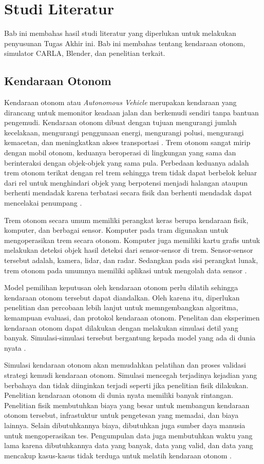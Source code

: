 \chapter{Studi Literatur}

Bab ini membahas hasil studi literatur yang diperlukan untuk melakukan
penyusunan Tugas Akhir ini. Bab ini membahas tentang kendaraan otonom, simulator
CARLA, Blender, dan penelitian terkait.

\section{Kendaraan Otonom}
Kendaraan otonom atau \textit{Autonomous Vehicle} merupakan kendaraan yang
dirancang untuk memonitor keadaan jalan dan berkemudi sendiri tanpa bantuan
pengemudi. Kendaraan otonom dibuat dengan tujuan mengurangi jumlah kecelakaan,
mengurangi penggunaan energi, mengurangi polusi, mengurangi kemacetan, dan
meningkatkan akses transportasi \parencite{av-bagloee}. Trem otonom sangat mirip
dengan mobil otonom, keduanya beroperasi di lingkungan yang sama dan
berinteraksi dengan objek-objek yang sama pula. Perbedaan keduanya adalah trem
otonom terikat dengan rel trem sehingga trem tidak dapat berbelok keluar dari
rel untuk menghindari objek yang berpotensi menjadi halangan ataupun berhenti
mendadak karena terbatasi secara fisik dan berhenti mendadak dapat mencelakai
penumpang \parencite{at-palmer}.

Trem otonom secara umum memiliki perangkat keras berupa kendaraan fisik,
komputer, dan berbagai sensor. Komputer pada tram digunakan untuk mengoperasikan
trem secara otonom. Komputer juga memiliki kartu grafis untuk melakukan deteksi
objek hasil deteksi dari sensor-sensor di trem. Sensor-sensor tersebut adalah,
kamera, lidar, dan radar. Sedangkan pada sisi perangkat lunak, trem otonom pada
umumnya memiliki aplikasi untuk mengolah data sensor \parencite{at-palmer}.

Model pemilihan keputusan oleh kendaraan otonom perlu dilatih sehingga kendaraan
otonom tersebut dapat diandalkan. Oleh karena itu, diperlukan penelitian dan
percobaan lebih lanjut untuk memngembangkan algoritma, kemampuan evaluasi, dan
protokol kendaraan otonom. Penelitan dan eksperimen kendaraan otonom dapat
dilakukan dengan melakukan simulasi detil yang banyak. Simulasi-simulasi
tersebut bergantung kepada model yang ada di dunia nyata \parencite{av-berger}.

Simulasi kendaraan otonom akan memudahkan pelatihan dan proses validasi strategi
kemudi kendaraan otonom. Simulasi mencegah terjadinya kejadian yang berbahaya
dan tidak diinginkan terjadi seperti jika penelitian fisik dilakukan. Penelitian
kendaraan otonom di dunia nyata memiliki banyak rintangan. Penelitian fisik
membutuhkan biaya yang besar untuk membangun kendaraan otonom tersebut,
infrastuktur untuk pengetesan yang memadai, dan biaya lainnya. Selain
dibutuhkannya biaya, dibutuhkan juga sumber daya manusia untuk mengoperasikan
tes. Pengumpulan data juga membutuhkan waktu yang lama karena dibutuhkannya data
yang banyak, data yang valid, dan data yang mencakup kasus-kasus tidak terduga
untuk melatih kendaraan otonom \parencite{carla-dosovitskiy}.

